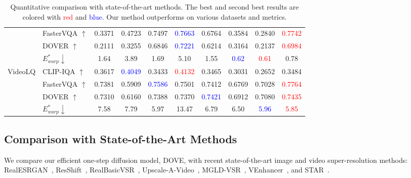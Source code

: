 \documentclass{article}
\begin{document}
\begin{table}[t]
{\begin{tabular}{l|l|c|c||c|c|c|c|c|c}
                & FasterVQA $\uparrow$    & 0.3371 & 0.4723 & 0.7497 & \textcolor{blue}{0.7663} & 0.6764 & 0.3584 & 0.2840 & \textcolor{red}{0.7742} \\
                & DOVER $\uparrow$        & 0.2111 & 0.3255 & 0.6846 & \textcolor{blue}{0.7221} & 0.6214 & 0.3164 & 0.2137 & \textcolor{red}{0.6984} \\
                & $E^*_{warp} \downarrow$ & 1.64   & 3.89   & 1.69   & 5.10   & 1.55   & \textcolor{blue}{0.62}   & \textcolor{red}{0.61} & 0.78 \\
            \midrule
            \multirow{4}{*}{VideoLQ}
                & CLIP-IQA $\uparrow$     & 0.3617 & \textcolor{blue}{0.4049} & 0.3433 & \textcolor{red}{0.4132} & 0.3465 & 0.3031 & 0.2652 & 0.3484 \\
                & FasterVQA $\uparrow$    & 0.7381 & 0.5909 & \textcolor{blue}{0.7586} & 0.7501 & 0.7412 & 0.6769 & 0.7028 & \textcolor{red}{0.7764} \\
                & DOVER $\uparrow$        & 0.7310 & 0.6160 & 0.7388 & 0.7370 & \textcolor{blue}{0.7421} & 0.6912 & 0.7080 & \textcolor{red}{0.7435} \\
                & $E^*_{warp} \downarrow$ & 7.58   & 7.79   & 5.97   & 13.47   & 6.79   & 6.50  & \textcolor{blue}{5.96} & \textcolor{red}{5.85} \\
            \bottomrule[0.1em]
        \end{tabular}
    }
    \vspace{-1.mm}
    \caption{Quantitative comparison with state-of-the-art methods. The best and second best results are colored with \textcolor{red}{red} and \textcolor{blue}{blue}. Our method outperforms on various datasets and metrics.}
    \vspace{-7.mm}
    \label{tab:quantitative}
\end{table}



\vspace{-4.mm}
\subsection{Comparison with State-of-the-Art Methods}
\vspace{-3.mm}
We compare our efficient one-step diffusion model, DOVE, with recent state-of-the-art image and video super-resolution methods: RealESRGAN~\cite{wang2021real}, ResShift~\cite{yue2023resshift}, RealBasicVSR~\cite{chan2022investigating}, Upscale-A-Video~\cite{zhou2024upscale}, MGLD-VSR~\cite{yang2024motion}, VEnhancer~\cite{he2024venhancer}, and STAR~\cite{xie2025star}.
\end{document}
